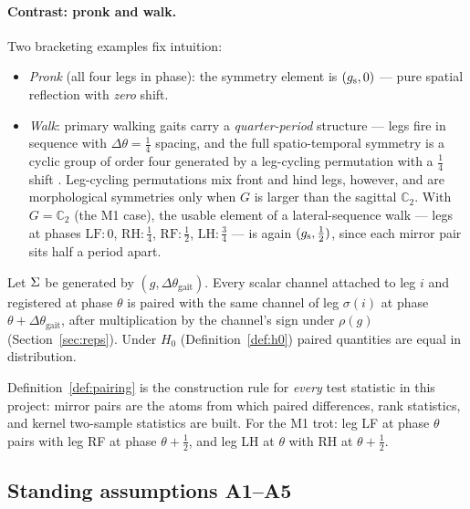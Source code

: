 \paragraph{Contrast: pronk and walk.}
Two bracketing examples fix intuition:
\begin{itemize}
  \item \emph{Pronk} (all four legs in phase): the symmetry element is
  $(g_{\mathrm{s}}, 0)$ --- pure spatial reflection with \emph{zero} shift.
  \item \emph{Walk}: primary walking gaits carry a \emph{quarter-period}
  structure --- legs fire in sequence with $\Delta\theta = \tfrac14$ spacing,
  and the full spatio-temporal symmetry is a cyclic group of order four
  generated by a leg-cycling permutation with a $\tfrac14$ shift
  \cite{golubitsky1999symmetry,collins1993coupled}. Leg-cycling permutations
  mix front and hind legs, however, and are morphological symmetries only when
  $G$ is larger than the sagittal $\mathbb{C}_2$. With $G = \mathbb{C}_2$
  (the M1 case), the usable element of a lateral-sequence walk --- legs at
  phases $\mathrm{LF}\!:0$, $\mathrm{RH}\!:\tfrac14$, $\mathrm{RF}\!:\tfrac12$,
  $\mathrm{LH}\!:\tfrac34$ --- is again $(g_{\mathrm{s}}, \tfrac12)$, since each mirror
  pair sits half a period apart.
\end{itemize}

\begin{definition}
\label{def:pairing}
Let $\Sigma$ be generated by $(g, \Delta\theta_{\mathrm{gait}})$. Every
scalar channel attached to leg $i$ and registered at phase $\theta$ is paired
with the same channel of leg $\sigma(i)$ at phase
$\theta + \Delta\theta_{\mathrm{gait}}$, after multiplication by the channel's
sign under $\rho(g)$ (Section~\ref{sec:reps}). Under $H_0$
(Definition~\ref{def:h0}) paired quantities are equal in distribution.
\end{definition}

Definition~\ref{def:pairing} is the construction rule for \emph{every} test
statistic in this project: mirror pairs are the atoms from which paired
differences, rank statistics, and kernel two-sample statistics are built. For
the M1 trot: leg LF at phase $\theta$ pairs with leg RF at phase
$\theta + \tfrac12$, and leg LH at $\theta$ with RH at $\theta + \tfrac12$.

\subsection{Standing assumptions A1--A5}
\label{sec:standing}

